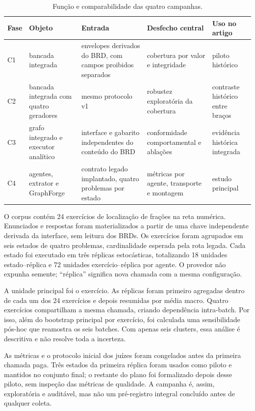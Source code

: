 \documentclass[11pt,a4paper]{article}
\begin{document}
\begin{table}[H]
\centering
\caption{Função e comparabilidade das quatro campanhas.}
\label{tab:campanhas}
\footnotesize
\setlength{\tabcolsep}{3pt}
\begin{tabularx}{\textwidth}{@{}C{1.05cm}P{3.0cm}P{3.3cm}P{3.4cm}Y@{}}
\toprule
Fase & Objeto & Entrada & Desfecho central & Uso no artigo \\
\midrule
C1 & bancada integrada & envelopes derivados do BRD, com campos proibidos separados & cobertura por valor e integridade & piloto histórico \\
C2 & bancada integrada com quatro geradores & mesmo protocolo v1 & robustez exploratória da cobertura & contraste histórico entre braços \\
C3 & grafo integrado e executor analítico & interface e gabarito independentes do conteúdo do BRD & conformidade comportamental e ablações & evidência histórica integrada \\
C4 & agentes, extrator e GraphForge & contrato legado implantado, quatro problemas por estado & métricas por agente, transporte e montagem & estudo principal \\
\bottomrule
\end{tabularx}
\end{table}

O corpus  contém 24 exercícios de localização de frações na reta numérica. Enunciados e respostas foram materializados a partir de uma chave independente derivada da interface, sem leitura dos BRDs. Os exercícios foram agrupados em seis estados de quatro problemas, cardinalidade esperada pela rota legada. Cada estado foi executado em três réplicas estocásticas, totalizando 18 unidades estado--réplica e 72 unidades exercício--réplica por agente. O provedor não expunha semente; ``réplica'' significa nova chamada com a mesma configuração.

A unidade principal foi o exercício. As réplicas foram primeiro agregadas dentro de cada um dos 24 exercícios e depois resumidas por média macro. Quatro exercícios compartilham a mesma chamada, criando dependência intra-batch. Por isso, além do bootstrap principal por exercício, foi calculada uma sensibilidade pós-hoc que reamostra os seis batches. Com apenas seis clusters, essa análise é descritiva e não resolve toda a incerteza.

As métricas e o protocolo inicial dos juízes foram congelados antes da primeira chamada paga. Três estados da primeira réplica foram usados como piloto e mantidos no conjunto final; o restante do plano foi formalizado depois desse piloto, sem inspeção das métricas de qualidade. A campanha é, assim, exploratória e auditável, mas não um pré-registro integral concluído antes de qualquer coleta.
\end{document}
